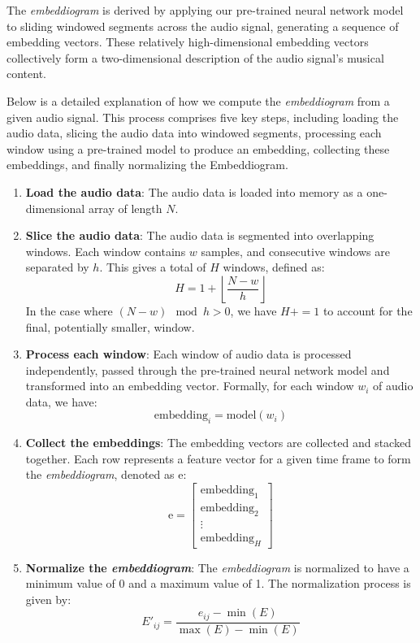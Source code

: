 The \textit{embeddiogram} is derived by applying our pre-trained neural network model to sliding windowed segments across the audio signal, generating a sequence of embedding vectors. These relatively high-dimensional embedding vectors collectively form a two-dimensional description of the audio signal's musical content.

Below is a detailed explanation of how we compute the \textit{embeddiogram} from a given audio signal. This process comprises five key steps, including loading the audio data, slicing the audio data into windowed segments, processing each window using a pre-trained model to produce an embedding, collecting these embeddings, and finally normalizing the Embeddiogram. 

\begin{enumerate}
\item \textbf{Load the audio data}: The audio data is loaded into memory as a one-dimensional array of length $N$.

\item \textbf{Slice the audio data}: The audio data is segmented into overlapping windows. Each window contains $w$ samples, and consecutive windows are separated by $h$. This gives a total of $H$ windows, defined as:
\begin{equation}
H = 1 + \left\lfloor \frac{N - w}{h} \right\rfloor
\end{equation}
In the case where $\left( N - w \right) \mod h > 0$, we have $H += 1$ to account for the final, potentially smaller, window.

\item \textbf{Process each window}: Each window of audio data is processed independently, passed through the pre-trained neural network model and transformed into an embedding vector. Formally, for each window $w_i$ of audio data, we have:
\begin{equation}
\text{embedding}_i = \text{model}(w_i)
\end{equation}

\item \textbf{Collect the embeddings}: The embedding vectors are collected and stacked together. Each row represents a feature vector for a given time frame to form the \textit{embeddiogram}, denoted as $\text{e}$:
\begin{equation}
\text{e} = \begin{bmatrix} \text{embedding}_1 \\ \text{embedding}_2 \\ \vdots \\ \text{embedding}_H \end{bmatrix}
\end{equation}

\item \textbf{Normalize the \textit{embeddiogram}}: The \textit{embeddiogram} is normalized to have a minimum value of 0 and a maximum value of 1. The normalization process is given by:
\begin{equation}
E'_{ij} = \frac{e_{ij} - \min(E)}{\max(E) - \min(E)}
\end{equation}
\end{enumerate}

